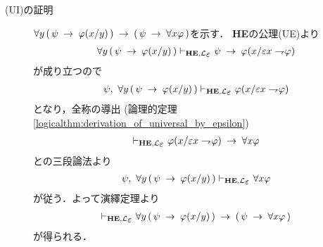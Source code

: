\begin{metaprf}
\begin{description}
				\begin{description}
					\item[(UI)の証明]
						$\forall y\, (\, \psi \hspace{0.25em}\rightarrow\hspace{0.25em} \varphi(x/y)\, ) 
						\hspace{0.25em}\rightarrow\hspace{0.25em} (\, \psi \hspace{0.25em}\rightarrow\hspace{0.25em} \forall x \varphi\, )$を示す．
						{\bf HE}の公理(UE)より
						\begin{align}
							\forall y\, (\, \psi \rarrow \varphi(x/y)\, ) \provable{\mbox{{\bf HE}},\lang{\varepsilon}} 
							\psi \rarrow \varphi(x/\varepsilon x \negation \varphi)
						\end{align}
						が成り立つので
						\begin{align}
							\psi,\ \forall y\, (\, \psi \rarrow \varphi(x/y)\, ) \provable{\mbox{{\bf HE}},\lang{\varepsilon}} 
							\varphi(x/\varepsilon x \negation \varphi)
						\end{align}
						となり，全称の導出
						(論理的定理\ref{logicalthm:derivation_of_universal_by_epsilon})
						\begin{align}
							\provable{\mbox{{\bf HE}},\lang{\varepsilon}} \varphi(x/\varepsilon x \negation \varphi)
							\rarrow \forall x \varphi
						\end{align}
						との三段論法より
						\begin{align}
							\psi,\ \forall y\, (\, \psi \rarrow \varphi(x/y)\, ) \provable{\mbox{{\bf HE}},\lang{\varepsilon}}
							\forall x \varphi
						\end{align}
						が従う．よって演繹定理より
						\begin{align}
							\provable{\mbox{{\bf HE}},\lang{\varepsilon}} \forall y\, (\, \psi \rarrow \varphi(x/y)\, )
							\rarrow (\, \psi \rarrow \forall x \varphi\, )
						\end{align}
						が得られる．
					

\end{description}
\end{description}
\end{metaprf}
